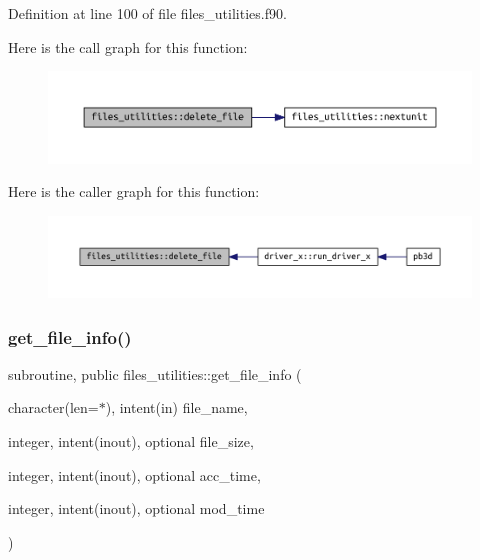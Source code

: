 Definition at line 100 of file files\+\_\+utilities.\+f90.

Here is the call graph for this function\+:
\nopagebreak
\begin{figure}[H]
\begin{center}
\leavevmode
\includegraphics[width=350pt]{namespacefiles__utilities_a083c08dfd3919fa2a1df01507fe431af_cgraph}
\end{center}
\end{figure}
Here is the caller graph for this function\+:
\nopagebreak
\begin{figure}[H]
\begin{center}
\leavevmode
\includegraphics[width=350pt]{namespacefiles__utilities_a083c08dfd3919fa2a1df01507fe431af_icgraph}
\end{center}
\end{figure}
\mbox{\label{namespacefiles__utilities_a07f2e430ff33c1e291731ad64c1fe482}} 
\subsubsection{\texorpdfstring{get\+\_\+file\+\_\+info()}{get\_file\_info()}}
{\footnotesize\ttfamily subroutine, public files\+\_\+utilities\+::get\+\_\+file\+\_\+info (\begin{DoxyParamCaption}\item[{character(len=$\ast$), intent(in)}]{file\+\_\+name,  }\item[{integer, intent(inout), optional}]{file\+\_\+size,  }\item[{integer, intent(inout), optional}]{acc\+\_\+time,  }\item[{integer, intent(inout), optional}]{mod\+\_\+time }\end{DoxyParamCaption})}



